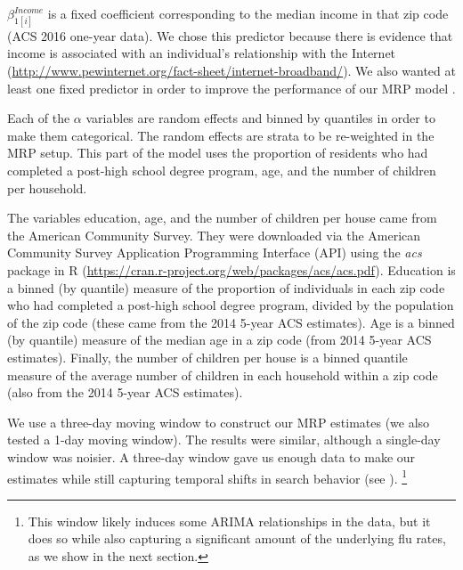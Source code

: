 \documentclass[12pt]{article}
\begin{document}
$\beta_{1[i]}^{Income}$ is a fixed coefficient corresponding to the median income in that zip code (ACS 2016 one-year data). We chose this predictor because there is evidence that income is associated with an individual's relationship with the Internet (\url{http://www.pewinternet.org/fact-sheet/internet-broadband/}). We also wanted at least one fixed predictor in order to improve the performance of our MRP model \citep{buttice_and_highton_2013}.

Each of the $\alpha$ variables are random effects and binned by quantiles in order to make them categorical. The random effects are strata to be re-weighted in the MRP setup. This part of the model uses the proportion of residents who had completed a post-high school degree program, age, and the number of children per household.

The variables education, age, and the number of children per house came from the American Community Survey. They were downloaded via the American Community Survey Application Programming Interface (API) using the \emph{acs} package in R (\url{https://cran.r-project.org/web/packages/acs/acs.pdf}). Education is a binned (by quantile) measure of the proportion of individuals in each zip code who had completed a post-high school degree program, divided by the population of the zip code (these came from the 2014 5-year ACS estimates). Age is a binned (by quantile) measure of the median age in a zip code (from 2014 5-year ACS estimates). Finally, the number of children per house is a binned quantile measure of the average number of children in each household within a zip code (also from the 2014 5-year ACS estimates). 

We use a three-day moving window to construct our MRP estimates (we also tested a 1-day moving window). The results were similar, although a single-day window was noisier. A three-day window gave us enough data to make our estimates while still capturing temporal shifts in search behavior (see \citet{yang_etal_2015inference}). \footnote{This window likely induces some ARIMA relationships in the data, but it does so while also capturing a significant amount of the underlying flu rates, as we show in the next section.} 

\end{document}
